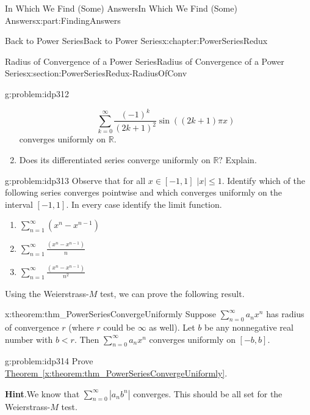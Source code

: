 \documentclass[oneside,10pt,]{book}
\newcommand{\blocktitlefont}{\relax}
\newcommand{\xreffont}{\relax}
\numberwithin{equation}{section}
\newcommand{\abs}[1]{\left|#1\right|}
\newcommand{\RR}{\mathbb {R}}
\newcommand{\lt}{<}
\begin{document}
\begin{partptx}{In Which We Find (Some) Answers}{}{In Which We Find (Some) Answers}{}{}{x:part:FindingAnswers}
\begin{chapterptx}{Back to Power Series}{}{Back to Power Series}{}{}{x:chapter:PowerSeriesRedux}
\begin{sectionptx}{Radius of Convergence of a Power Series}{}{Radius of Convergence of a Power Series}{}{}{x:section:PowerSeriesRedux-RadiusOfConv}
\begin{problem}{}{g:problem:idp312}
\begin{enumerate}[font=\bfseries,label=(\alph*),ref=\alph*]
\begin{equation*}
\sum_{k=0}^\infty\frac{(-1)^k}{(2k+1)^2}\sin\left((2k+1)\pi x\right)
\end{equation*}
converges uniformly on \(\RR\).%
\item{}Does its differentiated series converge uniformly on \(\RR?\) Explain.%
\end{enumerate}
\end{problem}
\begin{problem}{}{g:problem:idp313}%
Observe that for all \(x \in [-1,1]\) \(\abs{x}\le 1\). Identify which of the following series converges pointwise and which converges uniformly on the interval \([-1,1]\). In every case identify the limit function.%
\begin{enumerate}[font=\bfseries,label=(\alph*),ref=\alph*]
\item{}\(\displaystyle \sum_{n=1}^\infty\left(x^n-x^{n-1}\right)\)%
\item{}\(\displaystyle \sum_{n=1}^\infty\frac{\left(x^n-x^{n-1}\right)}{n}\)%
\item{}\(\sum_{n=1}^\infty\frac{\left(x^n-x^{n-1}\right)}{n^2}\)%
\end{enumerate}
\end{problem}
Using the Weierstrass-\(M\) test, we can prove the following result.%
\begin{theorem}{}{}{x:theorem:thm_PowerSeriesConvergeUniformly}%
 Suppose \(\sum_{n=0}^\infty a_nx^n\) has radius of convergence \(r\) (where \(r\) could be \(\infty\) as well). Let \(b\) be any nonnegative real number with \(b\lt r\). Then \(\sum_{n=0}^\infty a_nx^n\) converges uniformly on \([-b,b]\).%
\end{theorem}
\begin{problem}{}{g:problem:idp314}%
Prove \hyperref[x:theorem:thm_PowerSeriesConvergeUniformly]{Theorem~{\xreffont\ref{x:theorem:thm_PowerSeriesConvergeUniformly}}}.%
\par\smallskip%
\noindent\textbf{\blocktitlefont Hint}.\hypertarget{g:hint:idp315}{}\quad{}We know that \(\sum_{n=0}^\infty|a_nb^n|\) converges. This should be all set for the Weierstrass-\(M\) test.%
\end{problem}

\end{sectionptx}
\end{chapterptx}
\end{partptx}
\end{document}
